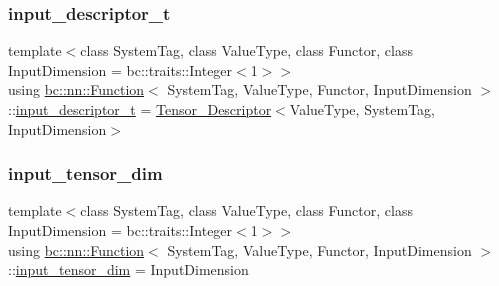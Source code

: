 \mbox{\label{structbc_1_1nn_1_1Function_a4851b2a44e4e723b04bc0fa85b5230e7}} 
\subsubsection{\texorpdfstring{input\+\_\+descriptor\+\_\+t}{input\_descriptor\_t}}
{\footnotesize\ttfamily template$<$class System\+Tag, class Value\+Type, class Functor, class Input\+Dimension = bc\+::traits\+::\+Integer$<$1$>$$>$ \\
using \hyperlink{structbc_1_1nn_1_1Function}{bc\+::nn\+::\+Function}$<$ System\+Tag, Value\+Type, Functor, Input\+Dimension $>$\+::\hyperlink{structbc_1_1nn_1_1Function_a4851b2a44e4e723b04bc0fa85b5230e7}{input\+\_\+descriptor\+\_\+t} =  \hyperlink{structbc_1_1nn_1_1Tensor__Descriptor}{Tensor\+\_\+\+Descriptor}$<$Value\+Type, System\+Tag, Input\+Dimension$>$}

\mbox{\label{structbc_1_1nn_1_1Function_a77caf4997c1a02816179a2c3773f487e}} 
\subsubsection{\texorpdfstring{input\+\_\+tensor\+\_\+dim}{input\_tensor\_dim}}
{\footnotesize\ttfamily template$<$class System\+Tag, class Value\+Type, class Functor, class Input\+Dimension = bc\+::traits\+::\+Integer$<$1$>$$>$ \\
using \hyperlink{structbc_1_1nn_1_1Function}{bc\+::nn\+::\+Function}$<$ System\+Tag, Value\+Type, Functor, Input\+Dimension $>$\+::\hyperlink{structbc_1_1nn_1_1Function_a77caf4997c1a02816179a2c3773f487e}{input\+\_\+tensor\+\_\+dim} =  Input\+Dimension}

\mbox{\label{structbc_1_1nn_1_1Function_ab3450a09e41881b85f3f37112245b4f4}} 
